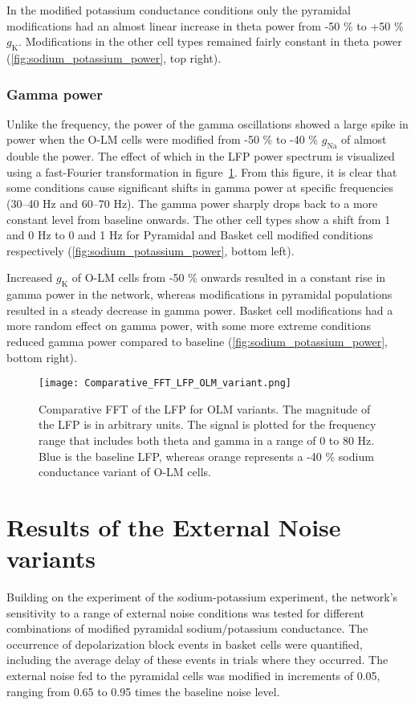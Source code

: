 In the modified potassium conductance conditions only the pyramidal modifications had an almost linear increase in theta power from -50 \% to +50 \% \(g_{\text{K}}\).
Modifications in the other cell types remained fairly constant in theta power (\ref{fig:sodium_potassium_power}, top right).

\subsubsection{Gamma power}
Unlike the frequency, the power of the gamma oscillations showed a large spike in power when the O-LM cells were modified from -50 \% to -40 \% \(g_{\text{Na}}\) of almost double the power.
The effect of which in the LFP power spectrum is visualized using a fast-Fourier transformation in figure~\ref{fig:comparative_fft_olm_variant}.
From this figure, it is clear that some conditions cause significant shifts in gamma power at specific frequencies (30--40 Hz and 60--70 Hz).
The gamma power sharply drops back to a more constant level from baseline onwards.
The other cell types show a shift from 1 and 0 Hz to 0 and 1 Hz for Pyramidal and Basket cell modified conditions respectively (\ref{fig:sodium_potassium_power}, bottom left).

Increased \(g_{\text{K}}\) of O-LM cells from -50 \% onwards resulted in a constant rise in gamma power in the network, whereas modifications in pyramidal populations resulted in a steady decrease in gamma power.
Basket cell modifications had a more random effect on gamma power, with some more extreme conditions reduced gamma power compared to baseline (\ref{fig:sodium_potassium_power}, bottom right).

\begin{figure}[htbp]
    \centering
    \texttt{[image: Comparative\_FFT\_LFP\_OLM\_variant.png]}
    \caption[Comparative FFT of LFP\@: O-LM variants]{Comparative FFT of the LFP for OLM variants.
        The magnitude of the LFP is in arbitrary units.
        The signal is plotted for the frequency range that includes both theta and gamma in a range of 0 to 80 Hz.
        Blue is the baseline LFP, whereas orange represents a -40 \% sodium conductance variant of O-LM cells.}\label{fig:comparative_fft_olm_variant}
\end{figure}

\pagebreak

\section{Results of the External Noise variants}
Building on the experiment of the sodium-potassium experiment, the network's sensitivity to a range of external noise conditions was tested for different combinations of modified pyramidal sodium/potassium conductance.
The occurrence of depolarization block events in basket cells were quantified, including the average delay of these events in trials where they occurred.
The external noise fed to the pyramidal cells was modified in increments of 0.05, ranging from 0.65 to 0.95 times the baseline noise level.


